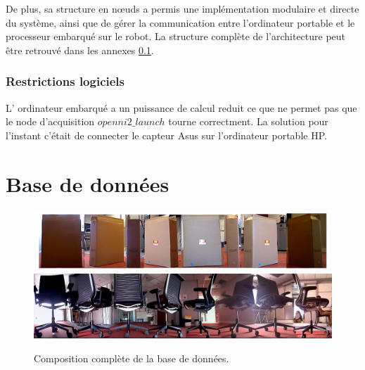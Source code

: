 De plus, sa structure en nœuds a permis une implémentation modulaire et directe du système, ainsi que de gérer la communication entre l'ordinateur portable et le processeur embarqué sur le robot. La structure complète de l'architecture peut être retrouvé dans les annexes \ref{}.

\subsection{Restrictions logiciels}
L' ordinateur embarqué a un puissance de calcul reduit ce que ne permet pas que le node d'acquisition \(openni2\_launch\) tourne correctment. La solution pour l'instant c'était de connecter le capteur Asus sur l'ordinateur portable HP.

\chapter{Base de données }
\label{annexe:dataset}
\begin{figure}[H]
	\includegraphics[width=\textwidth]{box_seq.png}
	\includegraphics[width=\textwidth]{chair_db.jpg}
	\label{fig:dataset}
	\caption{Composition complète de la base de données.}
\end{figure}

\begin{figure}[H]
\end{figure}

\begin{figure}[H]
\end{figure}




